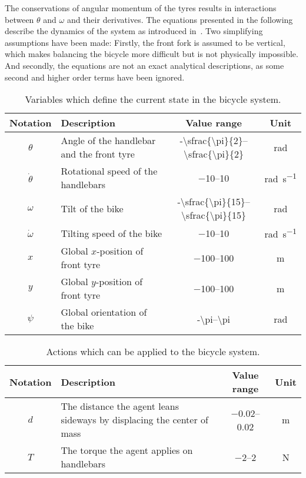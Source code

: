 The conservations of angular momentum of the tyres results in interactions between $\theta$ and $\omega$ and their derivatives.
The equations presented in the following describe the dynamics of the system as introduced in~\cite{randlov_learning_1998}.
Two simplifying assumptions have been made:
Firstly, the front fork is assumed to be vertical, which makes balancing the bicycle more difficult but is not physically impossible.
And secondly, the equations are not an exact analytical descriptions, as some second and higher order terms have been ignored.
\begin{table}[p]
    \centering
    \caption{Variables which define the current state in the bicycle system.}
    \label{tab:bicycle_variables}
    \begin{tabularx}{\tablewidth}{cXcc}
        \toprule
        Notation & Description & Value range & Unit \\
        \midrule
        $\theta$ & Angle of the handlebar and the front tyre & \numrange[parse-numbers=false]{-\sfrac{\pi}{2}}{\sfrac{\pi}{2}} & \si{\radian} \\
        $\dot{\theta}$ & Rotational speed of the handlebars & \numrange{-10}{10} & \si{\radian\per\second} \\
        $\omega$ & Tilt of the bike & \numrange[parse-numbers=false]{-\sfrac{\pi}{15}}{\sfrac{\pi}{15}} & \si{\radian} \\
        $\dot{\omega}$ & Tilting speed of the bike & \numrange{-10}{10} & \si{\radian\per\second} \\
        $x$ & Global $x$-position of front tyre & \numrange{-100}{100} & \si{\metre} \\
        $y$ & Global $y$-position of front tyre & \numrange{-100}{100} & \si{\metre} \\
        $\psi$ & Global orientation of the bike & \numrange[parse-numbers=false]{-\pi}{\pi} & \si{\radian} \\
        \bottomrule
    \end{tabularx}
\end{table}
\begin{table}[p]
    \centering
    \caption{Actions which can be applied to the bicycle system.}
    \label{tab:bicycle_actions}
    \begin{tabularx}{\tablewidth}{cXcc}
        \toprule
        Notation & Description & Value range & Unit \\
        \midrule
        $d$ & The distance the agent leans sideways by displacing the center of mass & \numrange{-0.02}{0.02} & \si{\metre} \\
        $T$ & The torque the agent applies on handlebars & \numrange{-2}{2} & \si{\N} \\
        \bottomrule
    \end{tabularx}
\end{table}
